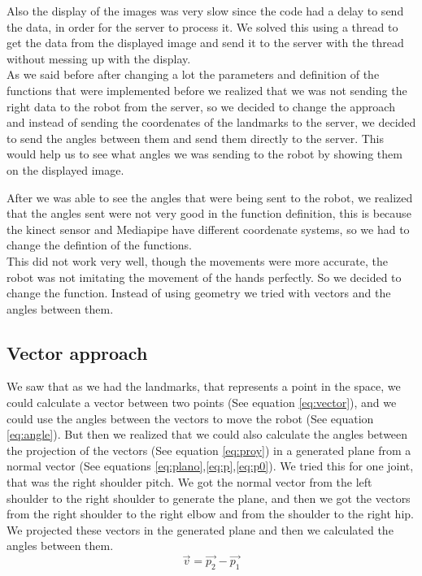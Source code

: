 \documentclass[conference]{IEEEtran}
\begin{document}
Also the display of the images was very slow since the code had a delay to send the data, in order for the server to process it. We solved this using a thread to get the data from the displayed image and send it to the server with the thread without messing up with the display.
\\
As we said before after changing a lot the parameters and definition of the functions that were implemented before we realized that we was not sending the right data to the robot from the server, so we decided to change the approach and instead of sending the coordenates of the landmarks to the server, we decided to send the angles between them and send them directly to the server. This would help us to see what angles we was sending to the robot by showing them on the displayed image.

After we was able to see the angles that were being sent to the robot, we realized that the angles sent were not very good in the function definition, this is because the kinect sensor and Mediapipe have different coordenate systems, so we had to change the defintion of the functions.
\\
This did not work very well, though the movements were more accurate, the robot was not imitating the movement of the hands perfectly. So we decided to change the function. Instead of using geometry we tried with vectors and the angles between them.

\subsection{Vector approach}
We saw that as we had the landmarks, that represents a point in the space, we could calculate a vector between two points (See equation \ref{eq:vector}), and we could use the angles between the vectors to move the robot (See equation \ref{eq:angle}). But then we realized that we could also calculate the angles between the projection of the vectors (See equation \ref{eq:proy}) in a generated plane from a normal vector (See equations \ref{eq:plano},\ref{eq:p},\ref{eq:p0}). We tried this for one joint, that was the right shoulder pitch. We got the normal vector from the left shoulder to the right shoulder to generate the plane, and then we got the vectors from the right shoulder to the right elbow and from the shoulder to the right hip. We projected these vectors in the generated plane and then we calculated the angles between them. 
\begin{equation}\label{eq:vector}
    \vec{v} = \vec{p_2} - \vec{p_1}
\end{equation}
\end{document}
